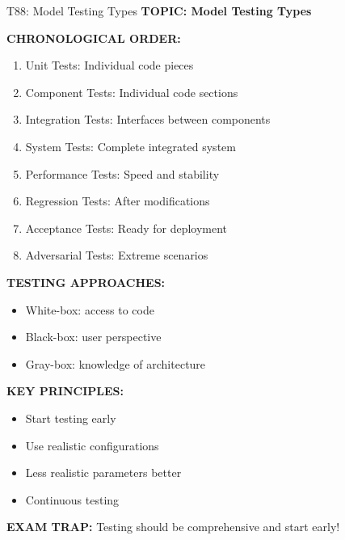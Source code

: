 \documentclass[8pt]{beamer}
\begin{document}
	\begin{frame}{T88: Model Testing Types}
		\fontsize{6.5}{7.5}\selectfont
		\textbf{TOPIC: Model Testing Types}
		
		\vspace{0.1cm}
		\textbf{CHRONOLOGICAL ORDER:}
		\begin{enumerate}
			\item \textcolor{myblue}{Unit Tests:} Individual code pieces
			\item \textcolor{myblue}{Component Tests:} Individual code sections
			\item \textcolor{myblue}{Integration Tests:} Interfaces between components
			\item \textcolor{myblue}{System Tests:} Complete integrated system
			\item \textcolor{myblue}{Performance Tests:} Speed and stability
			\item \textcolor{myblue}{Regression Tests:} After modifications
			\item \textcolor{myblue}{Acceptance Tests:} Ready for deployment
			\item \textcolor{myblue}{Adversarial Tests:} Extreme scenarios
		\end{enumerate}
		
		\vspace{0.1cm}
		\textbf{TESTING APPROACHES:}
		\begin{itemize}
			\item White-box: access to code
			\item Black-box: user perspective
			\item Gray-box: knowledge of architecture
		\end{itemize}
		
		\vspace{0.1cm}
		\textbf{KEY PRINCIPLES:}
		\begin{itemize}
			\item Start testing early
			\item Use realistic configurations
			\item Less realistic parameters better
			\item Continuous testing
		\end{itemize}
		
		\textcolor{myred}{\textbf{EXAM TRAP:}} Testing should be \textcolor{myblue}{comprehensive and start early}!
	\end{frame}
	
\end{document}
